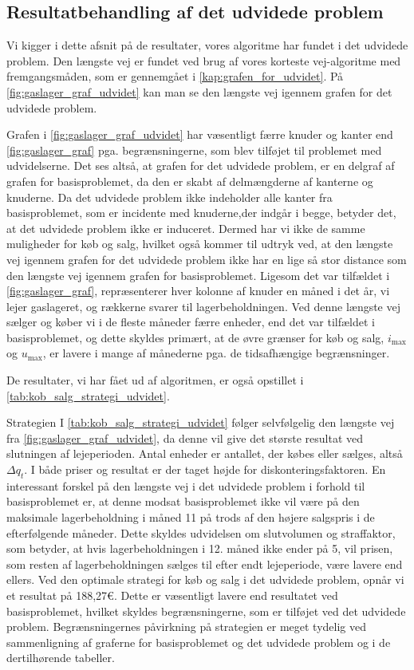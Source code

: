 \subsection{Resultatbehandling af det udvidede problem} \label{kap:resultat_udvidet}

Vi kigger i dette afsnit på de resultater, vores algoritme har fundet i det udvidede problem. Den længste vej er fundet ved brug af vores korteste vej-algoritme med fremgangsmåden, som er gennemgået i \autoref{kap:grafen_for_udvidet}. På \autoref{fig:gaslager_graf_udvidet} kan man se den længste vej igennem grafen for det udvidede problem.

Grafen i \autoref{fig:gaslager_graf_udvidet} har væsentligt færre knuder og kanter end \autoref{fig:gaslager_graf} pga. begrænsningerne, som blev tilføjet til problemet med udvidelserne. Det ses altså, at grafen for det udvidede problem, er en delgraf af grafen for basisproblemet, da den er skabt af delmængderne af kanterne og knuderne. 
Da det udvidede problem ikke indeholder alle kanter fra basisproblemet, som er incidente med knuderne,der indgår i begge, betyder det, at det udvidede problem ikke er induceret. Dermed har vi ikke de samme muligheder for køb og salg, hvilket også kommer til udtryk ved, at den længste vej igennem grafen for det udvidede problem ikke har en lige så stor distance som den længste vej igennem grafen for basisproblemet. Ligesom det var tilfældet i \autoref{fig:gaslager_graf}, repræsenterer hver kolonne af knuder en måned i det år, vi lejer gaslageret, og rækkerne svarer til lagerbeholdningen. Ved denne længste vej sælger og køber vi i de fleste måneder færre enheder, end det var tilfældet i basisproblemet, og dette skyldes primært, at de øvre grænser for køb og salg, $i_{\max}$ og $u_{\max}$, er lavere i mange af månederne pga. de tidsafhængige begrænsninger. 

De resultater, vi har fået ud af algoritmen, er også opstillet i \autoref{tab:kob_salg_strategi_udvidet}. 

Strategien I \autoref{tab:kob_salg_strategi_udvidet} følger selvfølgelig den længste vej fra \autoref{fig:gaslager_graf_udvidet}, da denne vil give det største resultat ved slutningen af lejeperioden. Antal enheder er antallet, der købes eller sælges, altså $\Delta q_t$. I både priser og resultat er der taget højde for diskonteringsfaktoren. En interessant forskel på den længste vej i det udvidede problem i forhold til basisproblemet er, at denne modsat basisproblemet ikke vil være på den maksimale lagerbeholdning i måned 11 på trods af den højere salgspris i de efterfølgende måneder. Dette skyldes udvidelsen om slutvolumen og straffaktor, som betyder, at hvis lagerbeholdningen i 12. måned ikke ender på 5, vil prisen, som resten af lagerbeholdningen sælges til efter endt lejeperiode, være lavere end ellers. 
Ved den optimale strategi for køb og salg i det udvidede problem, opnår vi et resultat på 188,27€. Dette er væsentligt lavere end resultatet ved basisproblemet, hvilket skyldes begrænsningerne, som er tilføjet ved det udvidede problem. Begrænsningernes påvirkning på strategien er meget tydelig ved sammenligning af graferne for basisproblemet og det udvidede problem og i de dertilhørende tabeller. 